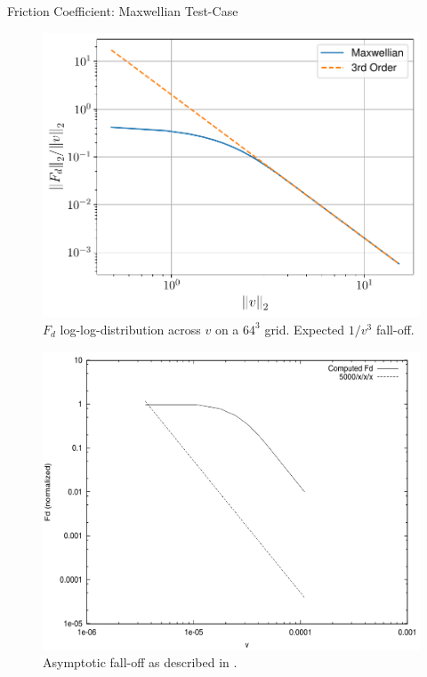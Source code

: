 \begin{frame}[c]{Friction Coefficient: Maxwellian Test-Case}
    \begin{multicols}{2}
    \begin{figure}[!htb]
        \centering
        \captionsetup{justification=centering}
      \includegraphics[width=1.03\linewidth]{figures/Fd_asymptotic_behavior.pdf}
      \caption{$F_d$ log-log-distribution across $v$ on a $64^3$ grid. Expected $1/v^3$ fall-off.}
      \label{fig:Fd_asymptotic_behavior_2nd}
    \end{figure}
    \columnbreak
    \begin{figure}[!htb]
        \centering
        \captionsetup{justification=centering}
      \includegraphics[width=1.03\linewidth]{figures/reference_asymptotic_behavior.png}
      \caption{Asymptotic fall-off as described in \cite{Qiang_selfConsistentLangevin}.}
      \label{fig:Fd_asymptotic_behavior_reference}
    \end{figure}
    \end{multicols}
\end{frame}

